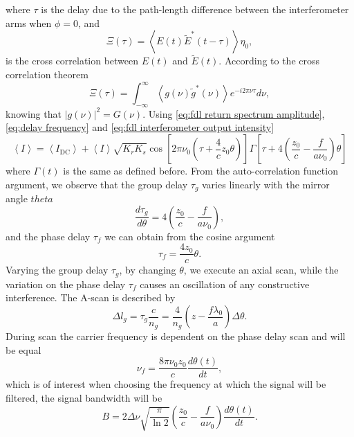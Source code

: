 \documentclass[12pt,twoside,english]{book}
\renewcommand{\~}{\perispomeni}%
\numberwithin{equation}{section}
\numberwithin{figure}{section}
\begin{document}
where $\tau$ is the delay due to the path-length difference between the interferometer arms when $\phi=0$, and
\begin{equation}
\Xi\left(\tau\right)={\left<E\left(t\right)\tilde{E}^*\left(t-\tau\right)\right>}{\eta_0},
\end{equation}
is the cross correlation between $E\left(t\right)$ and $\tilde{E}\left(t\right)$. According to the cross correlation theorem
\begin{equation}
\Xi\left(\tau\right)=\int_{-\infty}^{\infty}\left\langle g\left(\nu\right)\tilde{g}^{*}\left(\nu\right)\right\rangle e^{-i2\pi\nu\tau}d\nu,
\label{eq:cross correlation theorem}
\end{equation}
knowing that $\left|g\left(\nu\right)\right|^{2}=G\left(\nu\right)$. Using \ref{eq:fdl return spectrum amplitude}, \ref{eq:delay frequency} and \ref{eq:fdl interferometer output intensity}
\begin{equation}
\left\langle I\right\rangle =\left\langle I_{\text{DC}}\right\rangle +\left\langle I\right\rangle \sqrt{K_{r}K_{s}}\cos\left[2\pi\nu_{0}\left(\tau+\frac{4}{c}z_{0}\theta\right)\right]\Gamma\left[\tau+4\left(\frac{z_{0}}{c}-\frac{f}{a\nu_{0}}\right)\theta\right]
\label{eq:fdl final output intensity}
\end{equation}
where $\Gamma\left(t\right)$ is the same as defined before. From the auto-correlation function argument, we observe that the group delay $\tau_g$ varies linearly with the mirror angle $theta$
\begin{equation}
\frac{d\tau_{g}}{d\theta}=4\left(\frac{z_{0}}{c}-\frac{f}{a\nu_{0}}\right),
\end{equation}
and the phase delay $\tau_f$ we can obtain from the cosine argument
\begin{equation}
\tau_f=\frac{4z_0}{c}\theta.
\label{eq:fase delay}
\end{equation}
Varying the group delay $\tau_g$, by changing $\theta$, we execute an axial scan, while the variation on the phase delay $\tau_f$ causes an oscillation of any constructive interference. The A-scan is described by
\begin{equation}
\Delta l_g=\tau_g\frac{c}{n_g}=\frac{4}{n_g}\left(z-\frac{f\lambda_0}{a}\right)\Delta\theta.
\label{eq:delay angle}
\end{equation}
During scan the carrier frequency is dependent on the phase delay scan and will be equal
\begin{equation}
\nu_f=\frac{8\pi\nu_0 z_0}{c}\frac{d\theta\left(t\right)}{dt},
\label{eq:carrier frequency}
\end{equation}
which is of interest when choosing the frequency at which the signal will be filtered, the signal bandwidth will be
\begin{equation}
B=2\Delta\nu\sqrt{\frac{\pi}{\ln2}}\left(\frac{z_0}{c}-\frac{f}{a\nu_0}\right)\frac{d\theta\left(t\right)}{dt}.
\label{eq:signal bandwidth}
\end{equation}
\end{document}
